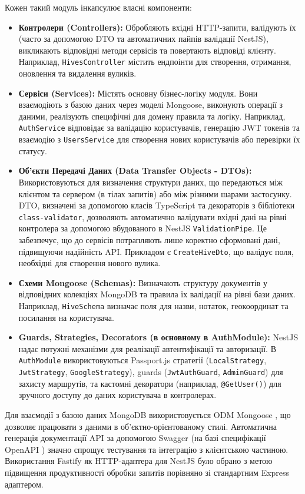 Кожен такий модуль інкапсулює власні компоненти:
\begin{itemize}
    \item \textbf{Контролери (Controllers):} Обробляють вхідні HTTP-запити, валідують їх (часто за допомогою DTO та автоматичних пайпів валідації NestJS), викликають відповідні методи сервісів та повертають відповіді клієнту. Наприклад, \texttt{HivesController} містить ендпоінти для створення, отримання, оновлення та видалення вуликів.
    \item \textbf{Сервіси (Services):} Містять основну бізнес-логіку модуля. Вони взаємодіють з базою даних через моделі Mongoose, виконують операції з даними, реалізують специфічні для домену правила та логіку. Наприклад, \texttt{AuthService} відповідає за валідацію користувачів, генерацію JWT токенів та взаємодію з \texttt{UsersService} для створення нових користувачів або перевірки їх статусу.
    \item \textbf{Об'єкти Передачі Даних (Data Transfer Objects - DTOs):} Використовуються для визначення структури даних, що передаються між клієнтом та сервером (в тілах запитів) або між різними шарами застосунку. DTO, визначені за допомогою класів TypeScript та декораторів з бібліотеки \texttt{class-validator}, дозволяють автоматично валідувати вхідні дані на рівні контролера за допомогою вбудованого в NestJS \texttt{ValidationPipe}. Це забезпечує, що до сервісів потрапляють лише коректно сформовані дані, підвищуючи надійність API. Прикладом є \texttt{CreateHiveDto}, що валідує поля, необхідні для створення нового вулика.
    \item \textbf{Схеми Mongoose (Schemas):} Визначають структуру документів у відповідних колекціях MongoDB та правила їх валідації на рівні бази даних. Наприклад, \texttt{HiveSchema} визначає поля для назви, нотаток, геокоординат та посилання на користувача.
    \item \textbf{Guards, Strategies, Decorators (в основному в AuthModule):} NestJS надає потужні механізми для реалізації автентифікації та авторизації. В \texttt{AuthModule} використовуються Passport.js стратегії (\texttt{LocalStrategy}, \texttt{JwtStrategy}, \texttt{GoogleStrategy}), guards (\texttt{JwtAuthGuard}, \texttt{AdminGuard}) для захисту маршрутів, та кастомні декоратори (наприклад, \texttt{@GetUser()}) для зручного доступу до даних користувача в контролерах.
\end{itemize}
Для взаємодії з базою даних MongoDB \cite{mongodb} використовується ODM Mongoose \cite{mongoose}, що дозволяє працювати з даними в об'єктно-орієнтованому стилі. Автоматична генерація документації API за допомогою Swagger (на базі специфікації OpenAPI \cite{openapi}) значно спрощує тестування та інтеграцію з клієнтською частиною. Використання Fastify \cite{fastify} як HTTP-адаптера для NestJS було обрано з метою підвищення продуктивності обробки запитів порівняно зі стандартним Express адаптером.


